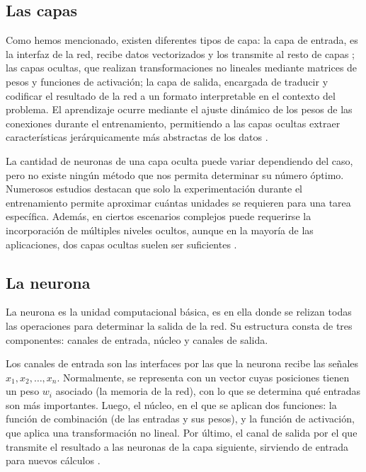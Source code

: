 \subsection{Las capas}

Como hemos mencionado, existen diferentes tipos de capa: la capa de entrada, es la interfaz de la red, recibe datos vectorizados y los transmite al resto de capas \cite{intro_rna__rivera_2005}; las capas ocultas, que realizan transformaciones no lineales mediante matrices de pesos y funciones de activación; la capa de salida, encargada de traducir y codificar el resultado de la red a un formato interpretable en el contexto del problema. El aprendizaje ocurre mediante el ajuste dinámico de los pesos de las conexiones durante el entrenamiento, permitiendo a las capas ocultas extraer características jerárquicamente más abstractas de los datos \cite{neurocomputing__hecht_nielsen_1998}.

La cantidad de neuronas de una capa oculta puede variar dependiendo del caso, pero no existe ningún método que nos permita determinar su número óptimo. Numerosos estudios destacan que solo la experimentación durante el entrenamiento permite aproximar cuántas unidades se requieren para una tarea específica. Además, en ciertos escenarios complejos puede requerirse la incorporación de múltiples niveles ocultos, aunque en la mayoría de las aplicaciones, dos capas ocultas suelen ser suficientes \cite{rna_fundamentos__hilera_2021}.

\subsection{La neurona}

La neurona es la unidad computacional básica, es en ella donde se relizan todas las operaciones para determinar la salida de la red. Su estructura consta de tres componentes: canales de entrada, núcleo y canales de salida.

Los canales de entrada son las interfaces por las que la neurona recibe las señales $x_1, x_2, \dots, x_n.$ Normalmente, se representa con un vector cuyas posiciones tienen un peso $w_i$ asociado (la memoria de la red), con lo que se determina qué entradas son más importantes. Luego, el núcleo, en el que se aplican dos funciones: la función de combinación (de las entradas y sus pesos), y la función de activación, que aplica una transformación no lineal. Por último, el canal de salida por el que transmite el resultado a las neuronas de la capa siguiente, sirviendo de entrada para nuevos cálculos \cite{intro_rna__rivera_2005}.


